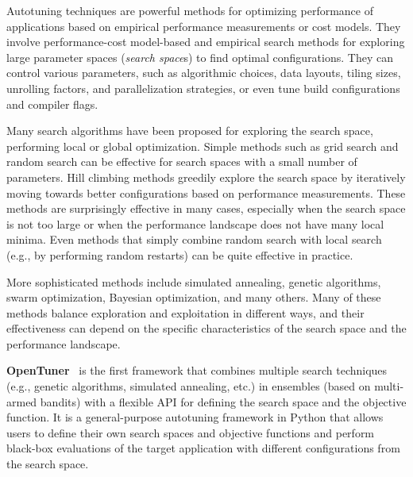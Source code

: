 Autotuning techniques are powerful methods for optimizing performance of applications based on empirical performance measurements or cost models. They involve performance-cost model-based and empirical search methods for exploring large parameter spaces (\emph{search space}s) to find optimal configurations. They can control various parameters, such as algorithmic choices, data layouts, tiling sizes, unrolling factors, and parallelization strategies, or even tune build configurations and compiler flags.

Many search algorithms have been proposed for exploring the search space, performing local or global optimization. Simple methods such as grid search and random search can be effective for search spaces with a small number of parameters. Hill climbing methods greedily explore the search space by iteratively moving towards better configurations based on performance measurements. These methods are surprisingly effective in many cases, especially when the search space is not too large or when the performance landscape does not have many local minima. Even methods that simply combine random search with local search (e.g., by performing random restarts) can be quite effective in practice.

More sophisticated methods include simulated annealing, genetic algorithms, swarm optimization, Bayesian optimization, and many others. Many of these methods balance exploration and exploitation in different ways, and their effectiveness can depend on the specific characteristics of the search space and the performance landscape.

\textbf{OpenTuner}~\cite{ansel2014opentuner} is the first framework that combines multiple search techniques (e.g., genetic algorithms, simulated annealing, etc.) in ensembles (based on multi-armed bandits) with a flexible API for defining the search space and the objective function. It is a general-purpose autotuning framework in Python that allows users to define their own search spaces and objective functions and perform black-box evaluations of the target application with different configurations from the search space.


